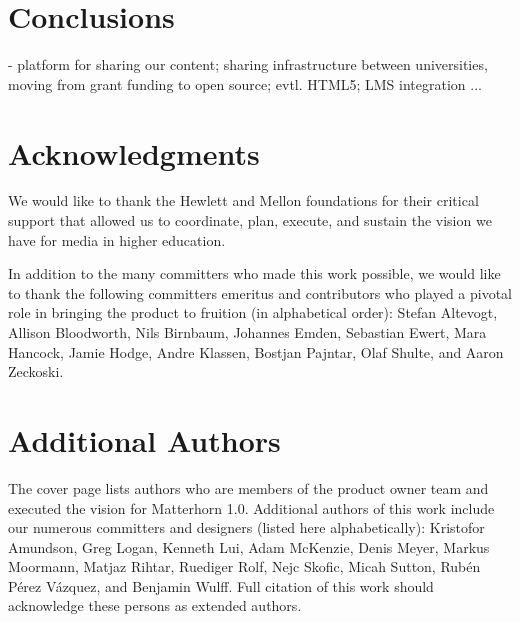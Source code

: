 \documentclass{sig-alternate}
\begin{document}
\section{Conclusions}
- platform for sharing our content; sharing infrastructure between universities, moving from grant funding to open source; evtl. HTML5; LMS integration ...

\section{Acknowledgments}
We would like to thank the Hewlett and Mellon foundations for their critical support that allowed us to coordinate, plan, execute, and sustain the vision we have for media in higher education.

In addition to the many committers who made this work possible, we would like to thank the following committers emeritus and contributors who played a pivotal role in bringing the product to fruition (in alphabetical order): Stefan Altevogt, Allison Bloodworth, Nils Birnbaum, Johannes Emden, Sebastian Ewert, Mara Hancock, Jamie Hodge, Andre Klassen, Bostjan Pajntar, Olaf Shulte, and Aaron Zeckoski.



\section{Additional Authors}
The cover page lists authors who are members of the product owner team and executed the vision for Matterhorn 1.0.  Additional authors of this work include our numerous committers and designers (listed here alphabetically): Kristofor Amundson, Greg Logan, Kenneth Lui, Adam McKenzie, Denis Meyer, Markus Moormann, Matjaz Rihtar, Ruediger Rolf, Nejc Skofic, Micah Sutton, Rub\'{e}n P\'{e}rez V\'{a}zquez, and Benjamin Wulff.  Full citation of this work should acknowledge these persons as extended authors.
\end{document}
